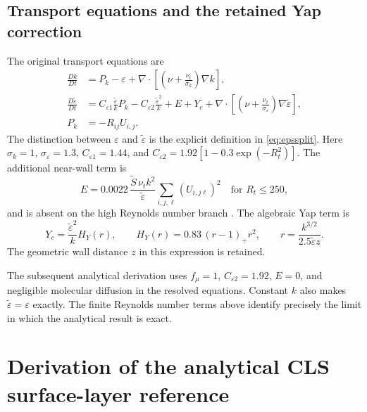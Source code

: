 \documentclass[11pt,a4paper]{article}
\numberwithin{equation}{section}
\newcommand{\eps}{\varepsilon}
\newcommand{\et}{\widetilde{\varepsilon}}
\newcommand{\nut}{\nu_t}
\newcommand{\pos}[1]{\left(#1\right)_+}
\begin{document}
\subsection{Transport equations and the retained Yap correction}
The original transport equations are
\begin{align}
\frac{Dk}{Dt}
 &=P_k-\eps+
 \nabla\cdot\left[\left(\nu+\frac{\nut}{\sigma_k}\right)\nabla k\right],
\label{eq:kfull}\\
\frac{D\et}{Dt}
 &=C_{\eps1}\frac{\et}{k}P_k-C_{\eps2}\frac{\et^2}{k}
 +E+Y_c+
 \nabla\cdot\left[\left(\nu+\frac{\nut}{\sigma_\eps}\right)\nabla\et\right],
\label{eq:efull}\\
P_k&=-R_{ij}U_{i,j}.
\label{eq:production-definition}
\end{align}
The distinction between $\eps$ and $\et$ is the explicit definition
in \cref{eq:epssplit}. Here $\sigma_k=1$, $\sigma_\eps=1.3$, $C_{\eps1}=1.44$, and
$C_{\eps2}=1.92[1-0.3\exp(-R_t^2)]$. The additional near-wall term is
\begin{equation}
 E=0.0022\,\frac{\widetilde S\,\nut k^2}{\et}
 \sum_{i,j,\ell}(U_{i,j\ell})^2
 \quad\text{for }R_t\leq250,
 \label{eq:E}
\end{equation}
and is absent on the high Reynolds number branch \cite{CLS1996}.
The algebraic Yap term is
\begin{equation}
 Y_c=\frac{\et^2}{k}H_Y(r),\qquad
 H_Y(r)=0.83\,\pos{r-1}r^2,\qquad
 r=\frac{k^{3/2}}{2.5\et z}.
 \label{eq:Yap}
\end{equation}
The geometric wall distance $z$ in this expression is retained.

The subsequent analytical derivation uses
$f_\mu=1$, $C_{\eps2}=1.92$, $E=0$, and negligible molecular diffusion
in the resolved equations. Constant $k$ also makes $\et=\eps$ exactly.
The finite Reynolds number terms above identify precisely the limit in
which the analytical result is exact.

\section{Derivation of the analytical CLS surface-layer reference}
\label{sec:derivation}
\end{document}
